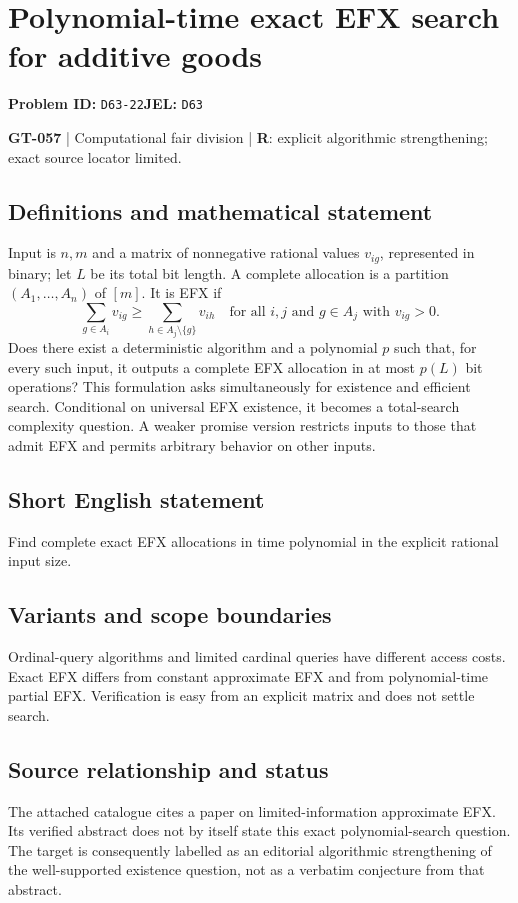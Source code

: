 \documentclass[11pt,a4paper]{article}
\begin{document}
\section*{Polynomial-time exact EFX search for additive goods}
\textbf{Problem ID:} \texttt{D63-22}\quad \textbf{JEL:} \texttt{D63}\par
\label{problem:OP-0187}
\label{game:GT-057}
{\sffamily\small\color{muted}
\textbf{GT-057} | Computational fair division | \textbf{R}: explicit algorithmic strengthening; exact source locator limited.
\par}
\subsection*{Definitions and mathematical statement}
Input is $n,m$ and a matrix of nonnegative rational values $v_{ig}$, represented in binary; let $L$ be its total bit length. A complete allocation is a partition $(A_1,\ldots,A_n)$ of $[m]$. It is EFX if
\[
 \sum_{g\in A_i}v_{ig}\geq
 \sum_{h\in A_j\setminus\{g\}}v_{ih}
 \quad\text{for all }i,j\text{ and }g\in A_j\text{ with }v_{ig}>0.
\]
Does there exist a deterministic algorithm and a polynomial $p$ such that, for every such input, it outputs a complete EFX allocation in at most $p(L)$ bit operations? This formulation asks simultaneously for existence and efficient search. Conditional on universal EFX existence, it becomes a total-search complexity question. A weaker promise version restricts inputs to those that admit EFX and permits arbitrary behavior on other inputs.
\subsection*{Short English statement}
Find complete exact EFX allocations in time polynomial in the explicit rational input size.
\subsection*{Variants and scope boundaries}
Ordinal-query algorithms and limited cardinal queries have different access costs. Exact EFX differs from constant approximate EFX and from polynomial-time partial EFX. Verification is easy from an explicit matrix and does not settle search.
\subsection*{Source relationship and status}
The attached catalogue cites a paper on limited-information approximate EFX. Its verified abstract does not by itself state this exact polynomial-search question. The target is consequently labelled as an editorial algorithmic strengthening of the well-supported existence question, not as a verbatim conjecture from that abstract.
\end{document}
